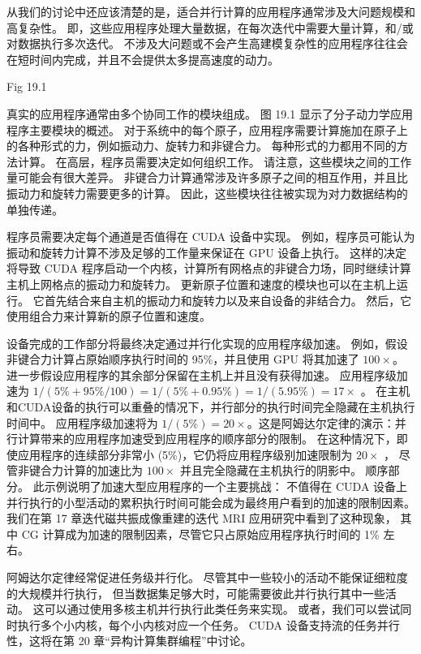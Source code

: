 从我们的讨论中还应该清楚的是，适合并行计算的应用程序通常涉及大问题规模和高复杂性。 
即，这些应用程序处理大量数据，在每次迭代中需要大量计算，和/或对数据执行多次迭代。 
不涉及大问题或不会产生高建模复杂性的应用程序往往会在短时间内完成，并且不会提供太多提高速度的动力。

{\color{red} Fig 19.1}

真实的应用程序通常由多个协同工作的模块组成。 图 19.1 显示了分子动力学应用程序主要模块的概述。 
对于系统中的每个原子，应用程序需要计算施加在原子上的各种形式的力，例如振动力、旋转力和非键合力。 
每种形式的力都用不同的方法计算。 在高层，程序员需要决定如何组织工作。 请注意，这些模块之间的工作量可能会有很大差异。 
非键合力计算通常涉及许多原子之间的相互作用，并且比振动力和旋转力需要更多的计算。 
因此，这些模块往往被实现为对力数据结构的单独传递。

程序员需要决定每个通道是否值得在 CUDA 设备中实现。 
例如，程序员可能认为振动和旋转力计算不涉及足够的工作量来保证在 GPU 设备上执行。 
这样的决定将导致 CUDA 程序启动一个内核，计算所有网格点的非键合力场，同时继续计算主机上网格点的振动力和旋转力。 
更新原子位置和速度的模块也可以在主机上运行。 它首先结合来自主机的振动力和旋转力以及来自设备的非结合力。 
然后，它使用组合力来计算新的原子位置和速度。

设备完成的工作部分将最终决定通过并行化实现的应用程序级加速。 
例如，假设非键合力计算占原始顺序执行时间的 95\%，并且使用 GPU 将其加速了 $100\times$。 
进一步假设应用程序的其余部分保留在主机上并且没有获得加速。 
应用程序级加速为 $1/(5\% + 95\%/100) = 1/(5\% + 0.95\%) = 1/(5.95\%) = 17\times$ 。 
在主机和CUDA设备的执行可以重叠的情况下，并行部分的执行时间完全隐藏在主机执行时间中。 
应用程序级加速将为 $1/(5\%) = 20\times$。这是阿姆达尔定律的演示：并行计算带来的应用程序加速受到应用程序的顺序部分的限制。 
在这种情况下，即使应用程序的连续部分非常小 (5\%)，它仍将应用程序级别加速限制为 $20\times$ ，
尽管非键合力计算的加速比为 $100\times $ 并且完全隐藏在主机执行的阴影中。 
顺序部分。 此示例说明了加速大型应用程序的一个主要挑战：
不值得在 CUDA 设备上并行执行的小型活动的累积执行时间可能会成为最终用户看到的加速的限制因素。 
我们在第 17 章迭代磁共振成像重建的迭代 MRI 应用研究中看到了这种现象，
其中 CG 计算成为加速的限制因素，尽管它只占原始应用程序执行时间的 1\% 左右。

阿姆达尔定律经常促进任务级并行化。 尽管其中一些较小的活动不能保证细粒度的大规模并行执行，
但当数据集足够大时，可能需要彼此并行执行其中一些活动。 这可以通过使用多核主机并行执行此类任务来实现。 
或者，我们可以尝试同时执行多个小内核，每个小内核对应一个任务。 
CUDA 设备支持流的任务并行性，这将在第 20 章“异构计算集群编程”中讨论。

